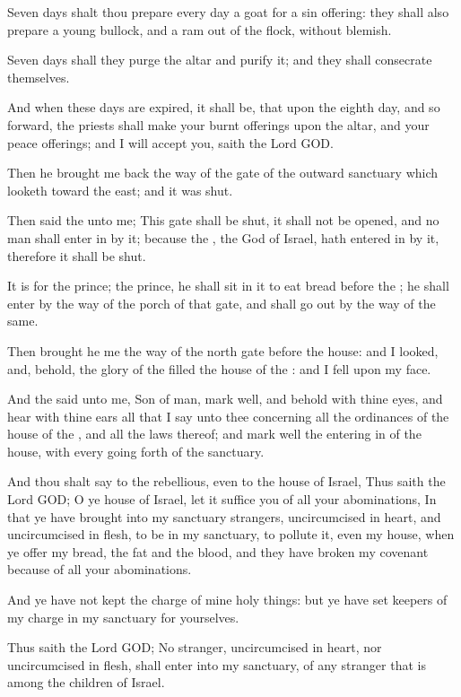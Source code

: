 \Verse Seven days shalt thou prepare every day a goat for a sin offering: they shall also prepare a young bullock, and a ram out of the flock, without blemish.

\Verse Seven days shall they purge the altar and purify it; and they shall consecrate themselves.

\Verse And when these days are expired, it shall be, that upon the eighth day, and so forward, the priests shall make your burnt offerings upon the altar, and your peace offerings; and I will accept you, saith the Lord GOD.


\Chapter
\Verse Then he brought me back the way of the gate of the outward sanctuary which looketh toward the east; and it was shut.

\Verse Then said the \LORD unto me; This gate shall be shut, it shall not be opened, and no man shall enter in by it; because the \LORD, the God of Israel, hath entered in by it, therefore it shall be shut.

\Verse It is for the prince; the prince, he shall sit in it to eat bread before the \LORD; he shall enter by the way of the porch of that gate, and shall go out by the way of the same.

\Verse Then brought he me the way of the north gate before the house: and I looked, and, behold, the glory of the \LORD filled the house of the \LORD: and I fell upon my face.

\Verse And the \LORD said unto me, Son of man, mark well, and behold with thine eyes, and hear with thine ears all that I say unto thee concerning all the ordinances of the house of the \LORD, and all the laws thereof; and mark well the entering in of the house, with every going forth of the sanctuary.

\Verse And thou shalt say to the rebellious, even to the house of Israel, Thus saith the Lord GOD; O ye house of Israel, let it suffice you of all your abominations, \Verse In that ye have brought into my sanctuary strangers, uncircumcised in heart, and uncircumcised in flesh, to be in my sanctuary, to pollute it, even my house, when ye offer my bread, the fat and the blood, and they have broken my covenant because of all your abominations.

\Verse And ye have not kept the charge of mine holy things: but ye have set keepers of my charge in my sanctuary for yourselves.

\Verse Thus saith the Lord GOD; No stranger, uncircumcised in heart, nor uncircumcised in flesh, shall enter into my sanctuary, of any stranger that is among the children of Israel.

